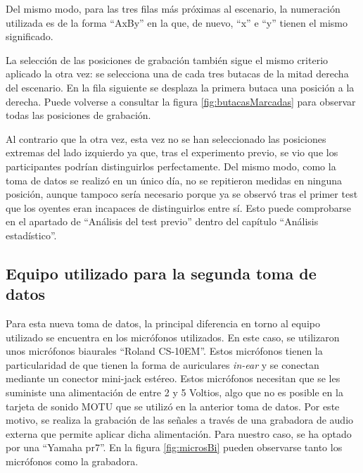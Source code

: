 \documentclass[11pt,a4paper,twoside]{book}
\begin{document}
            Del mismo modo, para las tres filas más próximas al escenario, la numeración utilizada es de la forma ``AxBy'' en la que, de nuevo, ``x'' e ``y'' tienen el mismo significado.\newline
                
            La selección de las posiciones de grabación también sigue el mismo criterio aplicado la otra vez: se selecciona una de cada tres butacas de la mitad derecha del escenario. En la fila siguiente se desplaza la primera butaca una posición a la derecha. Puede volverse a consultar la figura \ref{fig:butacasMarcadas} para observar todas las posiciones de grabación.
                
            Al contrario que la otra vez, esta vez no se han seleccionado las posiciones extremas del lado izquierdo ya que, tras el experimento previo, se vio que los participantes podrían distinguirlos perfectamente. Del mismo modo, como la toma de datos se realizó en un único día, no se repitieron medidas en ninguna posición, aunque tampoco sería necesario porque ya se observó tras el primer test que los oyentes eran incapaces de distinguirlos entre sí. Esto puede comprobarse en el apartado de ``Análisis del test previo'' dentro del capítulo ``Análisis estadístico''.
                
                
        \subsection{Equipo utilizado para la segunda toma de datos}
            Para esta nueva toma de datos, la principal diferencia en torno al equipo utilizado se encuentra en los micrófonos utilizados. En este caso, se utilizaron unos micrófonos biaurales ``Roland CS-10EM''. Estos micrófonos tienen la particularidad de que tienen la forma de auriculares \textit{in-ear} y se conectan mediante un conector mini-jack estéreo. Estos micrófonos necesitan que se les suministe una alimentación de entre 2 y 5 Voltios, algo que no es posible en la tarjeta de sonido MOTU que se utilizó en la anterior toma de datos. Por este motivo, se realiza la grabación de las señales a través de una grabadora de audio externa que permite aplicar dicha alimentación. Para nuestro caso, se ha optado por una ``Yamaha pr7''. En la figura \ref{fig:microsBi} pueden observarse tanto los micrófonos como la grabadora.
                
\end{document}
